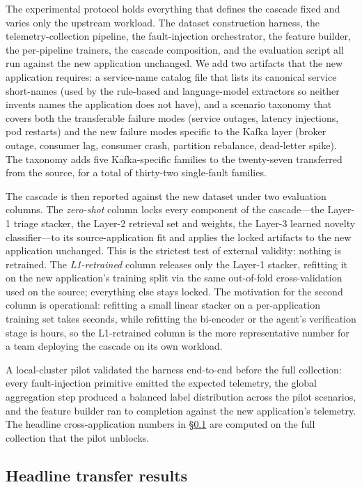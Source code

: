The experimental protocol holds everything that defines the cascade fixed and varies only the upstream workload. The dataset construction harness, the telemetry-collection pipeline, the fault-injection orchestrator, the feature builder, the per-pipeline trainers, the cascade composition, and the evaluation script all run against the new application unchanged. We add two artifacts that the new application requires: a service-name catalog file that lists its canonical service short-names (used by the rule-based and language-model extractors so neither invents names the application does not have), and a scenario taxonomy that covers both the transferable failure modes (service outages, latency injections, pod restarts) and the new failure modes specific to the Kafka layer (broker outage, consumer lag, consumer crash, partition rebalance, dead-letter spike). The taxonomy adds five Kafka-specific families to the twenty-seven transferred from the source, for a total of thirty-two single-fault families.

The cascade is then reported against the new dataset under two evaluation columns. The \emph{zero-shot} column locks every component of the cascade---the Layer-1 triage stacker, the Layer-2 retrieval set and weights, the Layer-3 learned novelty classifier---to its source-application fit and applies the locked artifacts to the new application unchanged. This is the strictest test of external validity: nothing is retrained. The \emph{L1-retrained} column releases only the Layer-1 stacker, refitting it on the new application's training split via the same out-of-fold cross-validation used on the source; everything else stays locked. The motivation for the second column is operational: refitting a small linear stacker on a per-application training set takes seconds, while refitting the bi-encoder or the agent's verification stage is hours, so the L1-retrained column is the more representative number for a team deploying the cascade on its own workload.

A local-cluster pilot validated the harness end-to-end before the full collection: every fault-injection primitive emitted the expected telemetry, the global aggregation step produced a balanced label distribution across the pilot scenarios, and the feature builder ran to completion against the new application's telemetry. The headline cross-application numbers in \S\ref{sec:cross-app:headline} are computed on the full collection that the pilot unblocks.

\subsection{Headline transfer results}
\label{sec:cross-app:headline}

